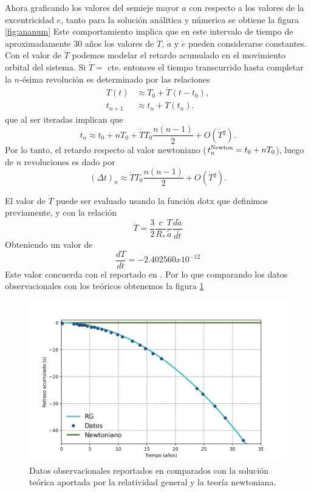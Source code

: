 Ahora graficando los valores del semieje mayor $a$ con respecto a los valores de la excentricidad $e$, tanto para la solución análitica y númerica se obtiene la figura
\ref{fig:ananum}
Este comportamiento implica que en este intervalo de tiempo de aproximadamente 30 años los valores de $\dot{T}$, $\dot{a}$ y $\dot{e}$ pueden considerarse constantes. Con el valor de $\dot{T}$ podemos modelar el retardo acumulado en el movimiento orbital del sistema. Si $\dot{T}=$ cte. entonces el tiempo transcurrido hasta completar la $n$-ésima revolución es determinado por las relaciones
\begin{align*}
T(t)&\approx T_0 + \dot{T}(t-t_0),\\
t_{n+1}& \approx t_n + T(t_n).
\end{align*}
que al ser iteradas implican que
\begin{equation*}
t_n \approx t_0+nT_0+\dot{T}T_0\frac{n(n-1)}{2}+O(\dot{T}{}^2).
\end{equation*}
Por lo tanto, el retardo respecto al valor newtoniano ($t_n^{\rm Newton}=t_0+nT_0$), luego de $n$ revoluciones es dado por
\begin{equation*}
(\Delta t)_n \approx \dot{T}T_0\frac{n(n-1)}{2}+O(\dot{T}{}^2).
\end{equation*}

El valor de $\dot{T}$ puede ser evaluado usando la función dotx que definimos previamente, y con la relación
\begin{equation*}
\dot{T}=\frac{3}{2}\frac{c}{R_\ast}\frac{T}{\tilde{a}}\frac{d\tilde{a}}{d\tilde{t}}
\end{equation*}
Obteniendo un valor de 
\begin{equation*}
    \frac{dT}{dt}=-2.402560x10^{-12}
\end{equation*}
Este valor concuerda con el reportado en \cite{Weisberg2010}. Por lo que comparando los datos observacionales con los teóricos obtenemos la figura \ref{fig:exp}
\begin{figure}[H]
    \centering
    \includegraphics[scale=0.75]{images/exp.png}
    \caption{Datos observacionales reportados en \cite{Weisberg2010} comparados con la solución teórica aportada por la relatividad general y la teoría newtoniana.}
    \label{fig:exp}
\end{figure}